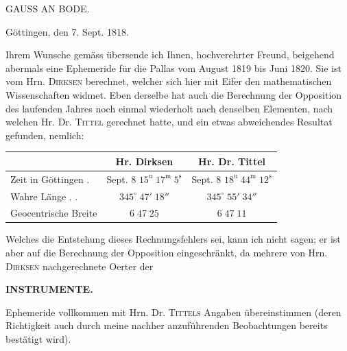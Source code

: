 \par{}\bigskip
\hypertarget{native-419-part-lower}{}\label{native-419-part-lower}
\begin{center}
\Large GAUSS AN BODE.
\end{center}


\begin{flushright}Göttingen, den 7. Sept. 1818.\end{flushright}

\par\indent Ihrem Wunsche gemäss übersende ich Ihnen, hochverehrter Freund, beigehend abermals eine Ephemeride für die Pallas vom August 1819 bis Juni 1820. Sie ist vom Hrn. \textsc{Dirksen} berechnet, welcher sich hier mit Eifer den mathematischen Wissenschaften widmet. Eben derselbe hat auch die Berechnung der Opposition des laufenden Jahres noch einmal wiederholt nach denselben Elementen, nach welchen Hr. Dr. \textsc{Tittel} gerechnet hatte, und ein etwas abweichendes Resultat gefunden, nemlich:

\begin{center}
\setlength{\tabcolsep}{3pt}
\begin{tabular}{l|c|c}
 & Hr. Dirksen & Hr. Dr. Tittel \\
\hline
Zeit in Göttingen . & \shortstack{Sept. 8\\$15^{\mathrm u}\;17^{\mathrm m}\;5^{\mathrm s}$} & \shortstack{Sept. 8\\$18^{\mathrm u}\;44^{\mathrm m}\;12^{\mathrm s}$} \\
Wahre Länge . . & $345^\circ\;47'\;18''$ & $345^\circ\;55'\;34''$ \\
Geocentrische Breite & $6\;47\;25$ & $6\;47\;11$ \\
\end{tabular}
\end{center}

\par\indent Welches die Entstehung dieses Rechnungsfehlers sei, kann ich nicht sagen; er ist aber auf die Berechnung der Opposition eingeschränkt, da mehrere von Hrn. \textsc{Dirksen} nachgerechnete Oerter der\par
\clearpage
\endgroup
\clearpage
\begingroup
\pagestyle{empty}
\thispagestyle{empty}
\noindent{}%
\makebox[12mm][l]{}%
\parbox[t]{\dimexpr\linewidth-24mm\relax}{\centering\footnotesize\bfseries INSTRUMENTE.\par}%
\par\nobreak\medskip
\noindent Ephemeride vollkommen mit Hrn. Dr. \textsc{Tittels} Angaben übereinstimmen (deren Richtigkeit auch durch meine nachher anzuführenden Beobachtungen bereits bestätigt wird).

